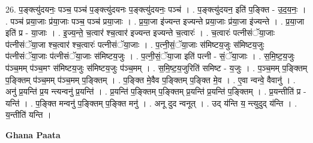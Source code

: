 \documentclass[17pt]{extarticle}
\begin{document}
26. प॒ङ्क्त्यु॑दयनः॒ पञ्च॒ पञ्च॑ प॒ङ्क्त्यु॑दयनः प॒ङ्क्त्यु॑दयनः॒ पञ्च॑ । . प॒ङ्क्त्यु॑दयन॒ इति॑ प॒ङ्क्ति - उ॒द॒य॒नः॒ । . पञ्च॑ प्रया॒जाः प्र॑या॒जाः पञ्च॒ पञ्च॑ प्रया॒जाः । . प्र॒या॒जा इ॑ज्यन्त इज्यन्ते प्रया॒जाः प्र॑या॒जा इ॑ज्यन्ते । . प्र॒या॒जा इति॑ प्र - या॒जाः । . इ॒ज्य॒न्ते॒ च॒त्वार॑ श्च॒त्वार॑ इज्यन्त इज्यन्ते च॒त्वारः॑ । . च॒त्वारः॑ पत्नीसंॅया॒जाः प॑त्नीसंॅया॒जा श्च॒त्वार॑ श्च॒त्वारः॑ पत्नीसंॅया॒जाः । . प॒त्नी॒सं॒ॅया॒जाः स॑मिष्टय॒जुः स॑मिष्टय॒जुः प॑त्नीसंॅया॒जाः प॑त्नीसंॅया॒जाः स॑मिष्टय॒जुः । . प॒त्नी॒सं॒ॅया॒जा इति॑ पत्नी - सं॒ॅया॒जाः । . स॒मि॒ष्ट॒य॒जुः प॑ञ्च॒मम् प॑ञ्च॒मꣳ स॑मिष्टय॒जुः स॑मिष्टय॒जुः प॑ञ्च॒मम् । . स॒मि॒ष्ट॒य॒जुरिति॑ समिष्ट - य॒जुः । . प॒ञ्च॒मम् प॒ङ्क्तिम् प॒ङ्क्तिम् प॑ञ्च॒मम् प॑ञ्च॒मम् प॒ङ्क्तिम् । . प॒ङ्क्ति मे॒वैव प॒ङ्क्तिम् प॒ङ्क्ति मे॒व । . ए॒वा न्वन्वे॒ वैवानु॑ । . अनु॑ प्र॒यन्ति॑ प्र॒य न्त्यन्वनु॑ प्र॒यन्ति॑ । . प्र॒यन्ति॑ प॒ङ्क्तिम् प॒ङ्क्तिम् प्र॒यन्ति॑ प्र॒यन्ति॑ प॒ङ्क्तिम् । . प्र॒यन्तीति॑ प्र - यन्ति॑ । . प॒ङ्क्ति मन्वनु॑ प॒ङ्क्तिम् प॒ङ्क्ति मनु॑ । . अनू दुद न्वनूत् । . उद् य॑न्ति य॒ न्त्युदुद् य॑न्ति । . य॒न्तीति॑ यन्ति । \newline

\textbf{Ghana Paata } \newline
\end{document}
